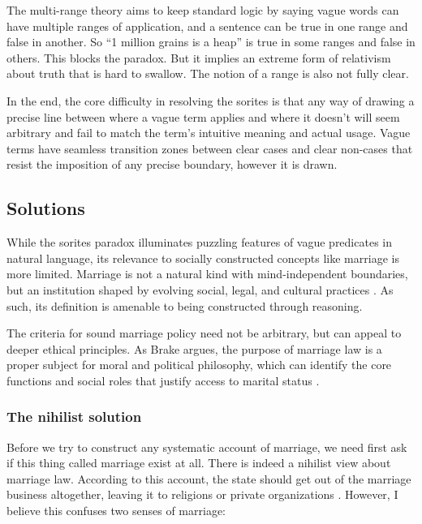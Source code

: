 \documentclass{article}
\begin{document}
The multi-range theory aims to keep standard logic by saying vague words can have multiple ranges of application, and a sentence can be true in one range and false in another. So ``1 million grains is a heap'' is true in some ranges and false in others. This blocks the paradox. But it implies an extreme form of relativism about truth that is hard to swallow. The notion of a range is also not fully clear.

In the end, the core difficulty in resolving the sorites is that any way of drawing a precise line between where a vague term applies and where it doesn't will seem arbitrary and fail to match the term's intuitive meaning and actual usage. Vague terms have seamless transition zones between clear cases and clear non-cases that resist the imposition of any precise boundary, however it is drawn.

\subsection{Solutions}

While the sorites paradox illuminates puzzling features of vague predicates in natural language, its relevance to socially constructed concepts like marriage is more limited. Marriage is not a natural kind with mind-independent boundaries, but an institution shaped by evolving social, legal, and cultural practices \autocite{coontzMarriageHistoryHow2006}. As such, its definition is amenable to being constructed through reasoning.

The criteria for sound marriage policy need not be arbitrary, but can appeal to deeper ethical principles. As Brake argues, the purpose of marriage law is a proper subject for moral and political philosophy, which can identify the core functions and social roles that justify access to marital status \autocite{brakeMinimizingMarriageMarriage2012}. 

\subsubsection{The nihilist solution}

Before we try to construct any systematic account of marriage, we need first ask if this thing called marriage exist at all. There is indeed a nihilist view about marriage law. According to this account, the state should get out of the marriage business altogether, leaving it to religions or private organizations \autocite{sunsteinPrivatizingMarriage2008,chartierPublicPracticePrivate2016}. However, I believe this confuses two senses of marriage: 
\end{document}

